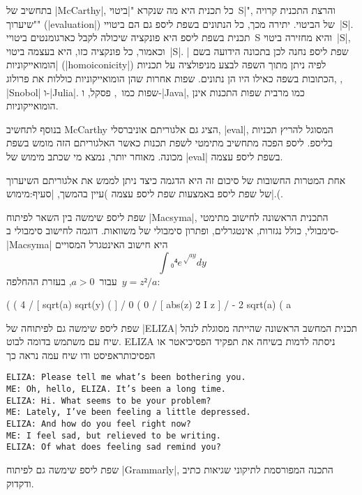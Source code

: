 בתחשיב של \E|McCarthy|, כל תכנית היא מה שנקרא "\ע|ביטוי~S|", והרצת התכנית קרויה
"שיערוך" (\E|evaluation|) של הביטוי. יתירה מכך, כל הנתונים בשפת ליספ גם הם
ביטויי~\E|S|. תכנית בשפת ליספ היא פונקציה שיכולה לקבל כארגומנטים ביטויי~S והיא
מחזירה ביטוי~\E|S|, וכאמור, כל פונקציה כזו, היא בעצמה ביטוי~\E|S|. שפת ליספ
נחנה לכן בתכונה הידועה בשם \ע|הומואייקוניות| (\E|homoiconicity|) לפיה ניתן מתוך
השפה לבצע מניפולציה על תכניות הכתובות בשפה כאילו היו הן נתונים. שפות אחרות שהן
הומואייקוניות כוללות את פרולוג, , \E|Snobol|
ו-\E|Julia|. שפות כמו~\CPL, פסקל, ו-\E|Java|, כמו מרבית שפות התכנות אינן
הומואייקוניות.

בנוסף לתחשיב McCarthy הציג גם אלגוריתם אוניברסלי, \E|eval|, המסוגל להריץ תכניות
בליספ. ליספ הפכה מתחשיב מתימטי לשפת תכנות כאשר האלגוריתם הזה מומש בשפת מכונה.
מאוחר יותר, נמצא מי שכתב מימוש של \E|eval| בשפת ליספ עצמה.

אחת המטרות החשובות של סיכום זה היא הדגמה כיצד ניתן לממש את אלגוריתם השיערוך של
שפת ליספ באמצעות שפת ליספ עצמה )עיין בהמשך, |סעיף:מימוש|.(.

שפת ליספ שימשה בין השאר לפיתוח \E|Macsyma|, התכנית הראשונה לחישוב מתימטי
סימבולי, כולל נגזרות, אינטגרלים, ופתרון סימבולי של משוואות.
דוגמה לחישוב סימבולי ב-\E|Macsyma| היא חישוב האינטגרל המסויים \[
  ∫₀⁴ e^{√{ay}}dy
\] עבור~$a>0$, בעזרת ההחלפה~$y=z²/a$:

\minipage\textwidth
\scriptsize
\begin{LISP}
(%
(%
                      4
                     /
                     [ sqrt(a) sqrt(y) (%
                     ]
                     /
                      0
(%
                      0
                     /
                     [ abs(z)
                   2 I z %
                     ]
                     /
- 2 sqrt(a)
(%
                                a
\end{LISP}
\endminipage

שפת ליספ שימשה גם לפיתוחה של \E|ELIZA| תכנית המחשב הראשונה שהייתה מסוגלת לנהל
שיח עם משתמש בדומה לבוט. ELIZA ניסתה לדמות בשיחה את תפקיד הפסיכיאטר או
הפסיכותראפיסט ודו שיח עמה נראה כך

\begin{minipage}\textwidth
  \begin{LTR}
    \scriptsize
    \begin{verbatim}
ELIZA: Please tell me what’s been bothering you.
ME: Oh, hello, ELIZA. It’s been a long time.
ELIZA: Hi. What seems to be your problem?
ME: Lately, I’ve been feeling a little depressed.
ELIZA: And how do you feel right now?
ME: I feel sad, but relieved to be writing.
ELIZA: Of what does feeling sad remind you?
\end{verbatim}
  \end{LTR}
\end{minipage}
שפת ליספ שימשה גם לפיתוח
\E|Grammarly|, התכנה המפורסמת לתיקוני שגיאות כתיב ודקדוק.

